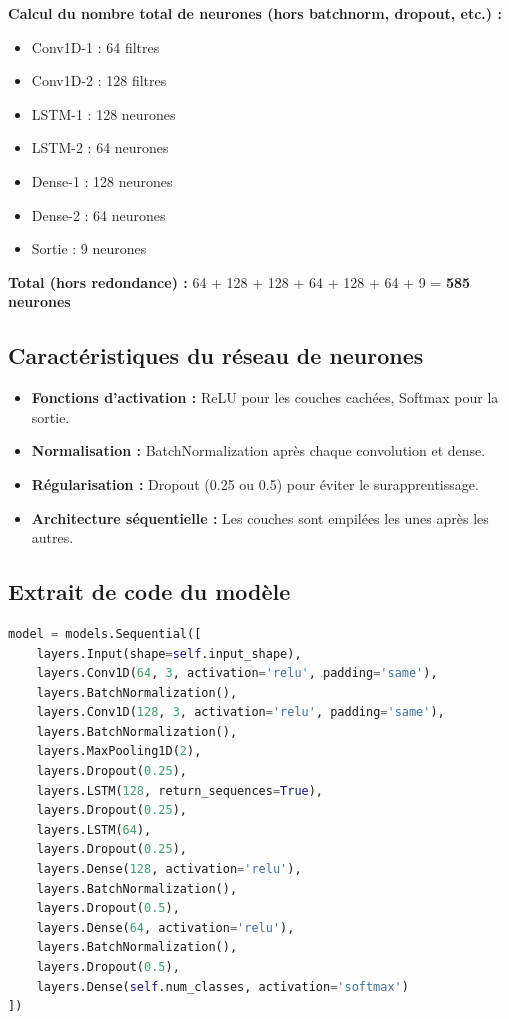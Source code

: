 \documentclass[a4paper,12pt]{article}
\begin{document}
\textbf{Calcul du nombre total de neurones (hors batchnorm, dropout, etc.) :}
\begin{itemize}
  \item Conv1D-1 : 64 filtres
  \item Conv1D-2 : 128 filtres
  \item LSTM-1 : 128 neurones
  \item LSTM-2 : 64 neurones
  \item Dense-1 : 128 neurones
  \item Dense-2 : 64 neurones
  \item Sortie : 9 neurones
\end{itemize}
\textbf{Total (hors redondance) :} 64 + 128 + 128 + 64 + 128 + 64 + 9 = \textbf{585 neurones}

\subsection{Caractéristiques du réseau de neurones}
\begin{itemize}
  \item \textbf{Fonctions d'activation :} ReLU pour les couches cachées, Softmax pour la sortie.
  \item \textbf{Normalisation :} BatchNormalization après chaque convolution et dense.
  \item \textbf{Régularisation :} Dropout (0.25 ou 0.5) pour éviter le surapprentissage.
  \item \textbf{Architecture séquentielle :} Les couches sont empilées les unes après les autres.
\end{itemize}

\subsection{Extrait de code du modèle}
\begin{lstlisting}[language=Python]
model = models.Sequential([
    layers.Input(shape=self.input_shape),
    layers.Conv1D(64, 3, activation='relu', padding='same'),
    layers.BatchNormalization(),
    layers.Conv1D(128, 3, activation='relu', padding='same'),
    layers.BatchNormalization(),
    layers.MaxPooling1D(2),
    layers.Dropout(0.25),
    layers.LSTM(128, return_sequences=True),
    layers.Dropout(0.25),
    layers.LSTM(64),
    layers.Dropout(0.25),
    layers.Dense(128, activation='relu'),
    layers.BatchNormalization(),
    layers.Dropout(0.5),
    layers.Dense(64, activation='relu'),
    layers.BatchNormalization(),
    layers.Dropout(0.5),
    layers.Dense(self.num_classes, activation='softmax')
])
\end{lstlisting}
\end{document}
